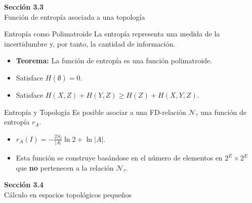 \documentclass{beamer}
\begin{document}
  \begin{frame}
    \begin{center}
      \Huge \textbf{Sección 3.3}\\
      \vspace{0.5cm}
      \Large Función de entropía asociada a una topología
    \end{center}
  \end{frame}

  \begin{frame}{Entropía como Polimatroide}
    La entropía representa una medida de la incertidumbre y, por tanto, la cantidad de información.
    
    \vspace{0.5cm}
    \begin{itemize}[<+->]
      \item \textbf{Teorema:} La función de entropía es una función polimatroide.
      \item Satisface $H(\emptyset)=0$.
      \item Satisface $H(X,Z)+H(Y,Z)\ge H(Z)+H(X,Y,Z)$.
    \end{itemize}
  \end{frame}

  \begin{frame}{Entropía y Topología}
    Es posible asociar a una FD-relación $\mathcal{N}_{\tau}$ una función de entropía $r_{A}$.
    
    \vspace{0.5cm}
    \begin{itemize}[<+->]
      \item $r_{A}(I) = -\frac{2S_{I}}{|A|}\ln 2 + \ln|A|$.
      \item Esta función se construye basándose en el número de elementos en $2^{E}\times2^{E}$ que \textbf{no} pertenecen a la relación $\mathcal{N}_{\tau}$.
    \end{itemize}
  \end{frame}

  \begin{frame}
    \begin{center}
      \Huge \textbf{Sección 3.4}\\
      \vspace{0.5cm}
      \Large Cálculo en espacios topológicos pequeños
    \end{center}
  \end{frame}
\end{document}
